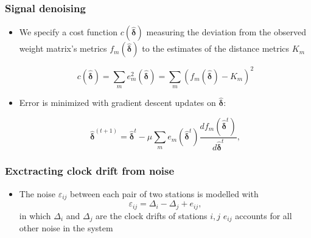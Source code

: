 \documentclass{beamer}
\begin{document}
\begin{frame}
\frametitle{Signal denoising}
\begin{itemize}
\item We specify a cost function $c(\bm{\hat{\delta}})$ measuring the deviation from the observed weight matrix's metrics $f_m(\bm{\hat{\delta}})$ to the estimates of the distance metrics $K_m$


\begin{equation}
c(\bm{\hat{\delta}}) = \sum_m e_m^2(\bm{\hat{\delta}}) = \sum_m(f_m(\bm{\hat{\delta}})-K_m)^2
\end{equation}

\item Error is minimized with gradient descent updates on $\bm{\hat{\delta}}$: 

\begin{equation}
\bm{\hat{\delta}}^{(t+1)} = \bm{\hat{\delta}}^t-\mu\sum_m e_m(\bm{\hat{\delta}}^t)\frac{df_m(\bm{\hat{\delta}}^t)}{d\bm{\hat{\delta}}^t},
\label{eq:updates}
\end{equation}
\end{itemize}
\end{frame}

\begin{frame}
\frametitle{Exctracting clock drift from noise}
\begin{itemize}
\item The noise $\varepsilon_{ij}$ between each pair of two stations is modelled with
\begin{equation}
\varepsilon_{ij} = \Delta_i - \Delta_j + e_{ij},
\end{equation}
\quad \quad in which $\Delta_i$ and $\Delta_j$ are the clock drifts of stations $i, j$
\quad \quad \quad $e_{ij}$ accounts for all other noise in the system

\end{itemize}
\end{frame}
\end{document}
